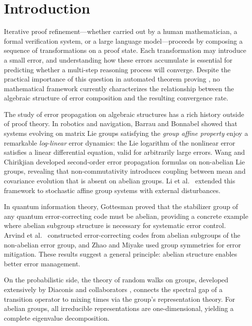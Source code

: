 \section{Introduction}\label{sec:intro}

Iterative proof refinement---whether carried out by a human mathematician,
a formal verification system, or a large language model---proceeds by
composing a sequence of transformations on a proof state.  Each
transformation may introduce a small error, and understanding how these
errors accumulate is essential for predicting whether a multi-step reasoning
process will converge.  Despite the practical importance of this question
in automated theorem proving \cite{gottesman1996}, no mathematical framework
currently characterizes the relationship between the algebraic structure of
error composition and the resulting convergence rate.

The study of error propagation on algebraic structures has a rich history
outside of proof theory.  In robotics and navigation, Barrau and Bonnabel
\cite{barrau2014} showed that systems evolving on matrix Lie groups
satisfying the \emph{group affine property} enjoy a remarkable
\emph{log-linear} error dynamics: the Lie logarithm of the nonlinear error
satisfies a linear differential equation, valid for arbitrarily large
errors.  Wang and Chirikjian \cite{wang2008} developed second-order error
propagation formulas on non-abelian Lie groups, revealing that
non-commutativity introduces coupling between mean and covariance evolution
that is absent on abelian groups.  Li et al.\ \cite{li2023} extended this
framework to stochastic affine group systems with external disturbances.

In quantum information theory, Gottesman \cite{gottesman1996} proved that
the stabilizer group of any quantum error-correcting code must be abelian,
providing a concrete example where abelian subgroup structure is necessary
for systematic error control.  Arvind et al.\ \cite{arvind2002} constructed
error-correcting codes from abelian subgroups of the non-abelian error
group, and Zhao and Miyake \cite{zhao2023} used group symmetries for error
mitigation.  These results suggest a general principle: abelian structure
enables better error management.

On the probabilistic side, the theory of random walks on groups, developed
extensively by Diaconis and collaborators \cite{diaconis1988}, connects the
spectral gap of a transition operator to mixing times via the group's
representation theory.  For abelian groups, all irreducible representations
are one-dimensional, yielding a complete eigenvalue decomposition.

